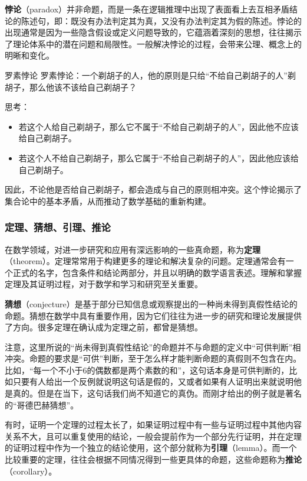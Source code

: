 \textbf{悖论}（paradox）并非命题，而是一条在逻辑推理中出现了表面看上去互相矛盾结论的陈述句，即：既没有办法判定其为真，又没有办法判定其为假的陈述。悖论的出现通常是因为一些隐含假设或定义问题导致的，它蕴涵着深刻的思想，往往揭示了理论体系中的潜在问题和局限性。一般解决悖论的过程，会带来公理、概念上的明晰和变化。

\begin{example}{罗素悖论}
罗素悖论：一个剃胡子的人，他的原则是只给“不给自己剃胡子的人”剃胡子，那么他该不该给自己剃胡子？

思考：
\begin{itemize}
\item 若这个人给自己剃胡子，那么它不属于“不给自己剃胡子的人”，因此他不应该给自己剃胡子。
\item 若这个人不给自己剃胡子，那么它属于“不给自己剃胡子的人”，因此他应该给自己剃胡子。
\end{itemize}
因此，不论他是否给自己剃胡子，都会造成与自己的原则相冲突。这个悖论揭示了集合论中的基本矛盾，从而推动了数学基础的重新构建。
\end{example}

\subsubsection{定理、猜想、引理、推论}

在数学领域，对进一步研究和应用有深远影响的一些真命题，称为\textbf{定理}（theorem）。定理常常用于构建更多的理论和解决复杂的问题。定理通常会有一个正式的名字，包含条件和结论两部分，并且以明确的数学语言表述。理解和掌握定理及其证明过程，对于数学和学习和研究至关重要。

\textbf{猜想}（conjecture）是基于部分已知信息或观察提出的一种尚未得到真假性结论的命题。猜想在数学中具有重要作用，因为它们往往为进一步的研究和理论发展提供了方向。很多定理在确认成为定理之前，都曾是猜想。

注意，这里所说的“尚未得到真假性结论”的命题并不与命题的定义中“可供判断”相冲突。命题的要求是“可供”判断，至于怎么样才能判断命题的真假则不包含在内。比如，“每一个不小于6的偶数都是两个素数的和”，这句话本身是可供判断的，比如只要有人给出一个反例就说明这句话是假的，又或者如果有人证明出来就说明他是真的。但是在当下，这句话我们尚不知道它的真伪。而刚才给出的例子就是著名的“哥德巴赫猜想”。

有时，证明一个定理的过程太长了，如果证明过程中有一些与证明过程中其他内容关系不大，且可以重复使用的结论，一般会提前作为一个部分先行证明，并在定理的证明过程中作为一个独立的结论使用，这个部分就称为\textbf{引理}（lemma）。而一个比较重要的定理，往往会根据不同情况得到一些更具体的命题，这些命题称为\textbf{推论}（corollary）。

